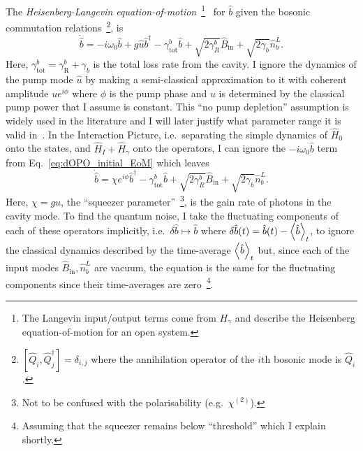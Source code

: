 The \emph{Heisenberg-Langevin equation-of-motion}~\footnote{The Langevin input/output terms come from $H_\gamma$ and describe the Heisenberg equation-of-motion for an open system.}~\cite{PhysRevA.31.3761,PhysRevA.30.1386} for $\hat b$ given the bosonic commutation relations~\footnote{$[\hat Q_i,\hat Q_j^\dag]=\delta_{i,j}$ where the annihilation operator of the $i\text{th}$ bosonic mode is $\hat Q_i$.}, is 
\begin{equation}\label{eq:dOPO_initial_EoM}
\dot{\hat{b}}= -i\omega_0 \hat b+g \hat u\hat b^\dag - \gamma^b_\mathrm{tot} \hat{b} + \sqrt{2\gamma^b_R}\hat{B}_\mathrm{in} + \sqrt{2\gamma_b}\hat{n}^L_b.
\end{equation}
Here, $\gamma^b_\text{tot}=\gamma^b_\text{R}+\gamma_b$ is the total loss rate from the cavity.
I ignore the dynamics of the pump mode $\hat u$ by making a semi-classical approximation to it with coherent amplitude $u e^{i\phi}$ where $\phi$ is the pump phase and $u$ is determined by the classical pump power that I assume is constant. This ``no pump depletion'' assumption is widely used in the literature and I will later justify what parameter range it is valid in~\cite{walls_1995}. In the Interaction Picture, i.e.\ separating the simple dynamics of $\hat H_0$ onto the states, and $\hat H_I + \hat H_\gamma$ onto the operators, I can ignore the $-i\omega_0 \hat b$ term from Eq.~\ref{eq:dOPO_initial_EoM} which leaves %
\begin{equation}
\label{eq:dOPO_pre_FT}
\dot{\hat{b}}= \chi e^{i\phi}\hat b^\dag - \gamma^b_\mathrm{tot} \hat{b} + \sqrt{2\gamma^b_R}\hat{B}_\mathrm{in} + \sqrt{2\gamma_b}\hat{n}^L_b.
\end{equation}
Here, $\chi = g u$, the ``squeezer parameter''~\footnote{Not to be confused with the polarisability (e.g.\ $\chi^{(2)}$).}, is the gain rate of photons in the cavity mode. 
To find the quantum noise, I take the fluctuating components of each of these operators implicitly, i.e.\ $\delta \hat b\mapsto\hat b$ where $\delta \hat b(t)=\hat b(t)-\ev{\hat b}_t$, to ignore the classical dynamics described by the time-average $\ev{\hat b}_t$ but, since each of the input modes $\hat{B}_\mathrm{in}, \hat{n}^L_b$ are vacuum, the equation is the same for the fluctuating components since their time-averages are zero~\footnote{Assuming that the squeezer remains below ``threshold'' which I explain shortly.}. %

